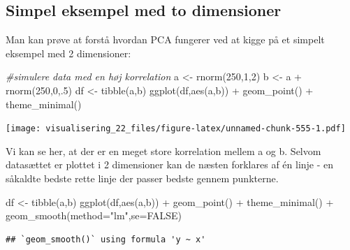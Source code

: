 \documentclass[
]{book}
\newenvironment{Shaded}{\begin{snugshade}}{\end{snugshade}}
\newcommand{\AttributeTok}[1]{\textcolor[rgb]{0.77,0.63,0.00}{#1}}
\newcommand{\CommentTok}[1]{\textcolor[rgb]{0.56,0.35,0.01}{\textit{#1}}}
\newcommand{\ConstantTok}[1]{\textcolor[rgb]{0.00,0.00,0.00}{#1}}
\newcommand{\DecValTok}[1]{\textcolor[rgb]{0.00,0.00,0.81}{#1}}
\newcommand{\FunctionTok}[1]{\textcolor[rgb]{0.00,0.00,0.00}{#1}}
\newcommand{\NormalTok}[1]{#1}
\newcommand{\OtherTok}[1]{\textcolor[rgb]{0.56,0.35,0.01}{#1}}
\newcommand{\SpecialCharTok}[1]{\textcolor[rgb]{0.00,0.00,0.00}{#1}}
\newcommand{\StringTok}[1]{\textcolor[rgb]{0.31,0.60,0.02}{#1}}
\begin{document}
\hypertarget{simpel-eksempel-med-to-dimensioner}{%
\subsection{Simpel eksempel med to dimensioner}\label{simpel-eksempel-med-to-dimensioner}}

Man kan prøve at forstå hvordan PCA fungerer ved at kigge på et simpelt eksempel med 2 dimensioner:

\begin{Shaded}
\begin{Highlighting}[]
\CommentTok{\#simulere data med en høj korrelation}
\NormalTok{a }\OtherTok{\textless{}{-}} \FunctionTok{rnorm}\NormalTok{(}\DecValTok{250}\NormalTok{,}\DecValTok{1}\NormalTok{,}\DecValTok{2}\NormalTok{)}
\NormalTok{b }\OtherTok{\textless{}{-}}\NormalTok{ a }\SpecialCharTok{+} \FunctionTok{rnorm}\NormalTok{(}\DecValTok{250}\NormalTok{,}\DecValTok{0}\NormalTok{,.}\DecValTok{5}\NormalTok{)}
\NormalTok{df }\OtherTok{\textless{}{-}} \FunctionTok{tibble}\NormalTok{(a,b)}
\FunctionTok{ggplot}\NormalTok{(df,}\FunctionTok{aes}\NormalTok{(a,b)) }\SpecialCharTok{+} 
  \FunctionTok{geom\_point}\NormalTok{() }\SpecialCharTok{+} 
  \FunctionTok{theme\_minimal}\NormalTok{()}
\end{Highlighting}
\end{Shaded}

\texttt{[image: visualisering\_22\_files/figure-latex/unnamed-chunk-555-1.pdf]}

Vi kan se her, at der er en meget store korrelation mellem a og b. Selvom datasættet er plottet i 2 dimensioner kan de næsten forklares af én linje - en såkaldte bedste rette linje der passer bedste gennem punkterne.

\begin{Shaded}
\begin{Highlighting}[]
\NormalTok{df }\OtherTok{\textless{}{-}} \FunctionTok{tibble}\NormalTok{(a,b)}
\FunctionTok{ggplot}\NormalTok{(df,}\FunctionTok{aes}\NormalTok{(a,b)) }\SpecialCharTok{+} 
  \FunctionTok{geom\_point}\NormalTok{() }\SpecialCharTok{+} 
  \FunctionTok{theme\_minimal}\NormalTok{() }\SpecialCharTok{+} 
  \FunctionTok{geom\_smooth}\NormalTok{(}\AttributeTok{method=}\StringTok{"lm"}\NormalTok{,}\AttributeTok{se=}\ConstantTok{FALSE}\NormalTok{)}
\end{Highlighting}
\end{Shaded}

\begin{verbatim}
## `geom_smooth()` using formula 'y ~ x'
\end{verbatim}
\end{document}
